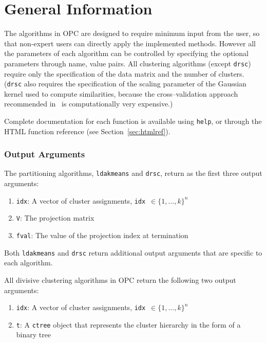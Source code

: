 \documentclass{book}
\begin{document}
\chapter{General Information}

The algorithms in OPC are designed to require minimum input from the user, so
that non-expert users can directly apply the implemented methods. However all
the parameters of each algorithm can be controlled by specifying
the optional parameters through name, value pairs.
%
All clustering algorithms (except {\tt drsc}) require only the specification
of the data matrix and the number of clusters. ({\tt drsc} also requires
the specification of the scaling parameter of the Gaussian kernel used
to compute similarities, because the
cross--validation approach recommended in~\cite{NiuDJ2011}
is computationally very expensive.)

\noindent
Complete documentation for each function is available using {\tt help},
or through the HTML function reference (see Section~\ref{sec:htmlref}).

\subsection*{Output Arguments}

The partitioning algorithms, {\tt ldakmeans} and {\tt drsc}, return as the
first three output arguments:
%
\begin{enumerate}

\item {\tt idx}: A vector of cluster assignments, {\tt idx}~$\in \{1,\ldots,k\}^n$

\item {\tt V}: The projection matrix

\item {\tt fval}: The value of the projection index at termination 

\end{enumerate}
%
Both {\tt ldakmeans} and {\tt drsc} return additional output arguments that are
specific to each algorithm.


All divisive clustering algorithms in OPC return the following two output arguments:
%
\begin{enumerate}

\item {\tt idx}: A vector of cluster assignments, {\tt idx}~$\in \{1,\ldots,k\}^n$

\item {\tt t}: A {\tt ctree} object that represents the cluster hierarchy in the form of a binary tree

\end{enumerate}
\end{document}
